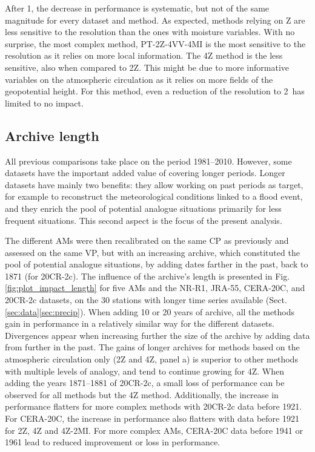 \documentclass{ametsoc}
\begin{document}
After 1\degree, the decrease in performance is systematic, but not of the same magnitude for every dataset and method. As expected, methods relying on Z are less sensitive to the resolution than the ones with moisture variables. With no surprise, the most complex method, PT-2Z-4VV-4MI is the most sensitive to the resolution as it relies on more local information. The 4Z method is the less sensitive, also when compared to 2Z. This might be due to more informative variables on the atmospheric circulation as it relies on more fields of the geopotential height. For this method, even a reduction of the resolution to 2\degree\ has limited to no impact.


\subsection{Archive length}

All previous comparisons take place on the period 1981--2010. However, some datasets have the important added value of covering longer periods. Longer datasets have mainly two benefits: they allow working on past periods as target, for example to reconstruct the meteorological conditions linked to a flood event, and they enrich the pool of potential analogue situations primarily for less frequent situations. This second aspect is the focus of the present analysis. 

The different AMs were then recalibrated on the same CP as previously and assessed on the same VP, but with an increasing archive, which constituted the pool of potential analogue situations, by adding dates farther in the past, back to 1871 (for 20CR-2c). The influence of the archive's length is presented in Fig. \ref{fig:plot_impact_length} for five AMs and the NR-R1, JRA-55, CERA-20C, and 20CR-2c datasets, on the 30 stations with longer time series available (Sect. \ref{sec:data}\ref{sec:precip}). When adding 10 or 20 years of archive, all the methods gain in performance in a relatively similar way for the different datasets. Divergences appear when increasing further the size of the archive by adding data from further in the past. The gains of longer archives for methods based on the atmospheric circulation only (2Z and 4Z, panel a) is superior to other methods with multiple levels of analogy, and tend to continue growing for 4Z. When adding the years 1871--1881 of 20CR-2c, a small loss of performance can be observed for all methods but the 4Z method. Additionally, the increase in performance flatters for more complex methods with 20CR-2c data before 1921. For CERA-20C, the increase in performance also flatters with data before 1921 for 2Z, 4Z and 4Z-2MI. For more complex AMs, CERA-20C data before 1941 or 1961 lead to reduced improvement or loss in performance.
\end{document}
